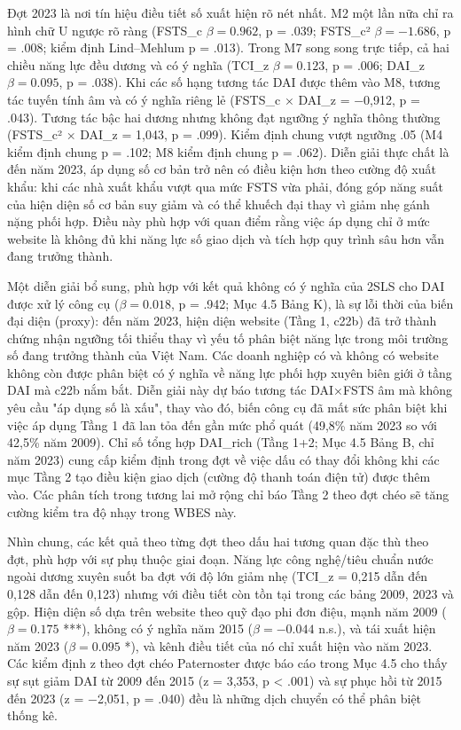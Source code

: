 \documentclass[12pt,a4paper]{article}
\begin{document}
Đợt 2023 là nơi tín hiệu điều tiết số xuất hiện rõ nét nhất. M2 một lần
nữa chỉ ra hình chữ U ngược rõ ràng (FSTS\_c \(\beta = 0.962\), p =
.039; FSTS\_c² \(\beta = −1.686\), p = .008; kiểm định Lind--Mehlum p =
.013). Trong M7 song song trực tiếp, cả hai chiều năng lực đều dương và
có ý nghĩa (TCI\_z \(\beta = 0.123\), p = .006; DAI\_z
\(\beta = 0.095\), p = .038). Khi các số hạng tương tác DAI được thêm
vào M8, tương tác tuyến tính âm và có ý nghĩa riêng lẻ (FSTS\_c × DAI\_z
= −0,912, p = .043). Tương tác bậc hai dương nhưng không đạt ngưỡng ý
nghĩa thông thường (FSTS\_c² × DAI\_z = 1,043, p = .099). Kiểm định
chung vượt ngưỡng .05 (M4 kiểm định chung p = .102; M8 kiểm định chung p
= .062). Diễn giải thực chất là đến năm 2023, áp dụng số cơ bản trở nên
có điều kiện hơn theo cường độ xuất khẩu: khi các nhà xuất khẩu vượt qua
mức FSTS vừa phải, đóng góp năng suất của hiện diện số cơ bản suy giảm
và có thể khuếch đại thay vì giảm nhẹ gánh nặng phối hợp. Điều này phù
hợp với quan điểm rằng việc áp dụng chỉ ở mức website là không đủ khi
năng lực số giao dịch và tích hợp quy trình sâu hơn vẫn đang trưởng
thành.

Một diễn giải bổ sung, phù hợp với kết quả không có ý nghĩa của 2SLS cho
DAI được xử lý công cụ (\(\beta = 0.018\), p = .942; Mục 4.5 Bảng K), là
sự lỗi thời của biến đại diện (proxy): đến năm 2023, hiện diện website
(Tầng 1, c22b) đã trở thành chứng nhận ngưỡng tối thiểu thay vì yếu tố
phân biệt năng lực trong môi trường số đang trưởng thành của Việt Nam.
Các doanh nghiệp có và không có website không còn được phân biệt có ý
nghĩa về năng lực phối hợp xuyên biên giới ở tầng DAI mà c22b nắm bắt.
Diễn giải này dự báo tương tác DAI×FSTS âm mà không yêu cầu "áp dụng số
là xấu", thay vào đó, biến công cụ đã mất sức phân biệt khi việc áp dụng
Tầng 1 đã lan tỏa đến gần mức phổ quát (49,8\% năm 2023 so với 42,5\%
năm 2009). Chỉ số tổng hợp DAI\_rich (Tầng 1+2; Mục 4.5 Bảng B, chỉ năm
2023) cung cấp kiểm định trong đợt về việc dấu có thay đổi không khi các
mục Tầng 2 tạo điều kiện giao dịch (cường độ thanh toán điện tử) được
thêm vào. Các phân tích trong tương lai mở rộng chỉ báo Tầng 2 theo đợt
chéo sẽ tăng cường kiểm tra độ nhạy trong WBES này.

Nhìn chung, các kết quả theo từng đợt theo dấu hai tương quan đặc thù
theo đợt, phù hợp với sự phụ thuộc giai đoạn. Năng lực công nghệ/tiêu
chuẩn nước ngoài dương xuyên suốt ba đợt với độ lớn giảm nhẹ (TCI\_z =
0,215 dẫn đến 0,128 dẫn đến 0,123) nhưng với điều tiết còn tồn tại trong
các bảng 2009, 2023 và gộp. Hiện diện số dựa trên website theo quỹ đạo
phi đơn điệu, mạnh năm 2009 (\(\beta = 0.175\) ***), không có ý nghĩa
năm 2015 (\(\beta = −0.044\) n.s.), và tái xuất hiện năm 2023
(\(\beta = 0.095\) *), và kênh điều tiết của nó chỉ xuất hiện vào năm
2023. Các kiểm định z theo đợt chéo Paternoster được báo cáo trong Mục
4.5 cho thấy sự sụt giảm DAI từ 2009 đến 2015 (z = 3,353, p \textless{}
.001) và sự phục hồi từ 2015 đến 2023 (z = −2,051, p = .040) đều là
những dịch chuyển có thể phân biệt thống kê.
\end{document}
